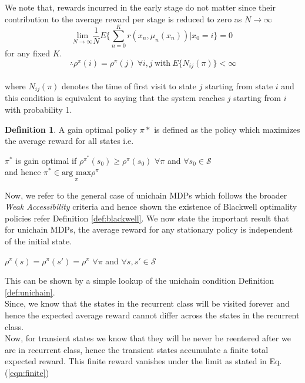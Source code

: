 \documentclass{article}
\theoremstyle{definition}
\newtheorem{definition}{Definition}[section]
\begin{document}
We note that, rewards incurred in the early stage do not matter since their contribution to the average reward per stage is reduced to zero as $N\rightarrow\infty$
\begin{equation}
    \label{eqn:finite}
    \underset{N\rightarrow\infty}{\text{lim}}\dfrac{1}{N}E\Big\{\sum_{n=0}^{K}r(x_n,\mu_n(x_n))|x_0=i\Big\}=0
\end{equation}
for any fixed $K$.\\
\[\therefore \rho^\pi(i)=\rho^\pi(j)\ \forall i,j\ \text{with} \ E\{N_{ij}(\pi)\}<\infty\] \\
where $N_{ij}(\pi)$ denotes the time of first visit to state $j$ starting from state $i$ and this condition is equivalent to saying that the system reaches $j$ starting from $i$ with probability 1.\\

\begin{definition}
A gain optimal policy $\pi*$ is defined as the policy which maximizes the average reward for all states i.e.
\begin{center}
    $\pi^*$ is gain optimal if $\rho^{\pi^*}(s_0)\geq\rho^{\pi}(s_0)$ $\forall \pi$ and $\forall s_0 \in \mathcal{S}$\\
and hence $\pi^* \in \underset{\pi}{\text{arg max}} \rho^\pi$
\end{center}

Now, we refer to the general case of unichain MDPs which follows the broader \textit{Weak Accessibility} criteria and hence shown the existence of Blackwell optimality policies refer Definition \ref{def:blackwell}.
We now state the important result that for unichain MDPs, the average reward for any stationary policy is independent of the initial state. 
\begin{center}
    $\rho^{\pi}(s) = \rho^{\pi}(s') = \rho^\pi$ $\forall \pi$ and $\forall s,s' \in \mathcal{S}$
\end{center}
    

This can be shown by a simple lookup of the unichain condition Definition \ref{def:unichain}. 
\\Since, we know that the states in the recurrent class will be visited forever and hence the expected average reward cannot differ across the states in the recurrent class. \\Now, for transient states we know that they will be never be reentered after we are in recurrent class, hence the transient states accumulate a finite total expected reward. This finite reward vanishes under the limit as stated in Eq. (\ref{eqn:finite})
\end{definition}
\end{document}
